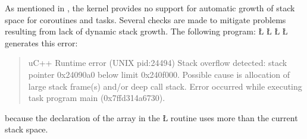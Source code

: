 \documentclass[openright,twoside]{report}
\begin{document}
\begin{comment}
When a coroutine (or task) is created, there must be sufficient memory to allocate its execution state.
The following program:
\LGinlinefalse\LGbegin\lgrinde
\L{\LB{\K{unsigned}\0\K{int}\0\V{uMainStackSize}()\0\{}}
\L{\LB{}\Tab{4}{\K{return}\01000000000;}\Tab{28}{\C{}\1\1\0very\0large\0stack\0size\0for\0main}}
\CE{}\L{\LB{\}}}
\L{\LB{\K{int}\0\V{main}()\0\{\}}}
\endlgrinde\LGend
generates this error:
\begin{quote}
\BGfont
uC++ Runtime error (UNIX pid:24848) Attempt to allocate 1000000000 bytes of storage for coroutine or task execution-state but insufficient memory available.
Error occurred while executing task uBootTask (0x4d6b0).
\end{quote}
because the declaration of the \Index{program main} by the \LGinlinetrue\LGbegin\lgrinde\L{\LB{\V{uBootTask}}}\endlgrinde\LGend{} fails due to the request for a 1000000000-byte stack\index{stack!overflow} for \LGinlinetrue\LGbegin\lgrinde\L{\LB{\V{main}}}\endlgrinde\LGend{}.
\end{comment}

As mentioned in , the \uC kernel provides no support for automatic growth of stack space for coroutines and tasks.
Several checks are made to mitigate problems resulting from lack of dynamic stack growth.
The following program:
\LGinlinefalse\LGbegin\lgrinde
\L{}
\L{\LB{}}
\CE{}\L{\LB{}}
\L{\LB{\}}}
\endlgrinde\LGend
generates this error:
\begin{quote}
\BGfont
uC++ Runtime error (UNIX pid:24494) Stack overflow detected: stack pointer 0x24090a0 below limit 0x240f000.
Possible cause is allocation of large stack frame(s) and/or deep call stack.
Error occurred while executing task program main (0x7ffd314a6730).
\end{quote}
because the declaration of the array in the \LGinlinetrue\LGbegin\lgrinde\L{}\endlgrinde\LGend{} routine uses more than the current stack space.
\end{document}
